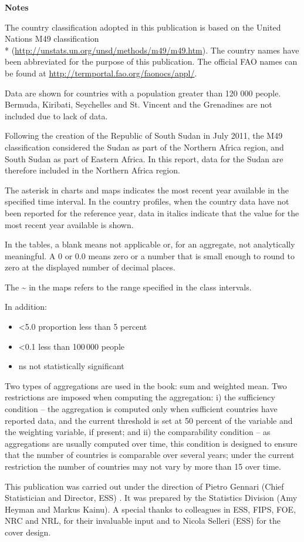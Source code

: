 \onecolumn
\LARGE
\textbf{Notes}

\footnotesize
The country classification adopted in this publication is based on the United Nations M49 classification \\* (\url{http://unstats.un.org/unsd/methods/m49/m49.htm}). The country names have been abbreviated for the purpose of this publication. The official FAO names can be found at \url{http://termportal.fao.org/faonocs/appl/}.

Data are shown for countries with a population greater than 120 000 people. Bermuda, Kiribati, Seychelles and St. Vincent and the Grenadines are not included due to lack of data.

Following the creation of the Republic of South Sudan in July 2011, the M49 classification considered the Sudan as part of the Northern Africa region, and South Sudan as part of Eastern Africa. In this report, data for the Sudan are therefore included in the Northern Africa region.

The asterisk in charts and maps indicates the most recent year available in the specified time interval. In the country profiles, when the country data have not been reported for the reference year, data in italics indicate that the value for the most recent year available is shown.

In the tables, a blank means not applicable or, for an aggregate, not analytically meaningful. A 0 or 0.0 means zero or a number that is small enough to round to zero at the displayed number of decimal places.

The \textasciitilde{} in the maps refers to the range specified in the class intervals.

In addition:
\begin{itemize}
\item <5.0 proportion less than 5 percent
\item <0.1 less than 100\,000 people
\item ns not statistically significant 
\end{itemize}

Two types of aggregations are used in the book: sum and weighted mean. Two restrictions are imposed when computing the aggregation: i) the sufficiency condition – the aggregation is computed only when sufficient countries have reported data, and the current threshold is set at 50 percent of the variable and the weighting variable, if present; and ii) the comparability condition – as aggregations are usually computed over time, this condition is designed to ensure that the number of countries is comparable over several years; under the current restriction the number of countries may not vary by more than 15 over time.

This publication was carried out under the direction of Pietro Gennari (Chief Statistician and Director, ESS) . It was prepared by the Statistics Division (Amy Heyman and Markus Kainu). A special thanks to colleagues in ESS, FIPS, FOE, NRC and NRL, for their invaluable input and to Nicola Selleri (ESS) for the cover design.
